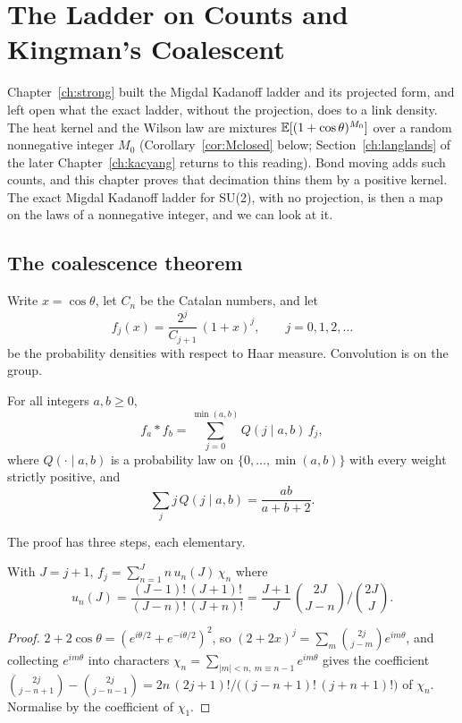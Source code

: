 \chapter{The Ladder on Counts and Kingman's Coalescent}\label{ch:counts}

Chapter~\ref{ch:strong} built the Migdal Kadanoff ladder and its projected form, and left open what the exact ladder, without the projection, does to a link density. The heat kernel and the Wilson law are mixtures $\mathbb{E}[(1+\cos\theta)^{M_0}]$ over a random nonnegative integer $M_0$ (Corollary~\ref{cor:Mclosed} below; Section~\ref{ch:langlands} of the later Chapter~\ref{ch:kacyang} returns to this reading). Bond moving adds such counts, and this chapter proves that decimation thins them by a positive kernel. The exact Migdal Kadanoff ladder for SU(2), with no projection, is then a map on the laws of a nonnegative integer, and we can look at it.

\section{The coalescence theorem}

Write $x=\cos\theta$, let $C_n$ be the Catalan numbers, and let
\[
f_j(x)=\frac{2^j}{C_{j+1}}\,(1+x)^j,\qquad j=0,1,2,\dots
\]
be the probability densities with respect to Haar measure. Convolution is on the group.

\begin{theorem}[coalescence]\label{thm:coalescence}
For all integers $a,b\ge0$,
\[
f_a*f_b=\sum_{j=0}^{\min(a,b)}Q(j\mid a,b)\,f_j ,
\]
where $Q(\cdot\mid a,b)$ is a probability law on $\{0,\dots,\min(a,b)\}$ with every weight strictly positive, and
\[
\sum_jj\,Q(j\mid a,b)=\frac{ab}{a+b+2}.
\]
\end{theorem}

The proof has three steps, each elementary.

\begin{lemma}[characters of $f_j$]\label{lem:fjchar}
With $J=j+1$, $f_j=\sum_{n=1}^{J}n\,u_n(J)\,\chi_n$ where
\[
u_n(J)=\frac{(J-1)!\,(J+1)!}{(J-n)!\,(J+n)!}=\frac{J+1}{J}\,\binom{2J}{J-n}\Big/\binom{2J}{J}.
\]
\end{lemma}

\begin{proof}
$2+2\cos\theta=(e^{i\theta/2}+e^{-i\theta/2})^2$, so $(2+2x)^j=\sum_m\binom{2j}{j-m}e^{im\theta}$, and collecting $e^{im\theta}$ into characters $\chi_n=\sum_{|m|<n,\ m\equiv n-1}e^{im\theta}$ gives the coefficient $\binom{2j}{j-n+1}-\binom{2j}{j-n-1}=2n\,(2j+1)!/\big((j-n+1)!\,(j+n+1)!\big)$ of $\chi_n$. Normalise by the coefficient of $\chi_1$.
\end{proof}


